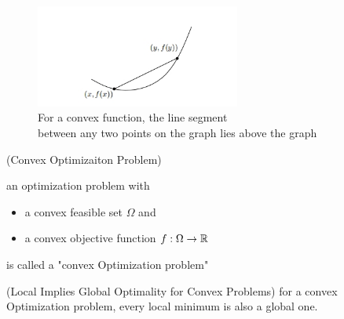 \begin{figure}[htbp]
    \centering
    \includegraphics[width=0.6\textwidth]{figure/ch1/secant_above_graph1.png}
    \caption{For a convex function, the line segment \\ between any two points on the graph lies
    above the graph}
\end{figure}

\begin{definition}{
    (Convex Optimizaiton Problem) %
  }{%
  }
    {
        an optimization problem with 
        \begin{itemize}
            \item a convex feasible set $\Omega$ and 
            \item a convex objective function $f: \Omega\rightarrow\mathbb{R}$
        
        \end{itemize}
        is called a "convex Optimization problem"
    }
\end{definition}






\begin{theorem}{
    (Local Implies Global Optimality for Convex Problems)
}{}
    {
        for a convex Optimization problem, every local minimum is also a global one. 
    }
\end{theorem}





